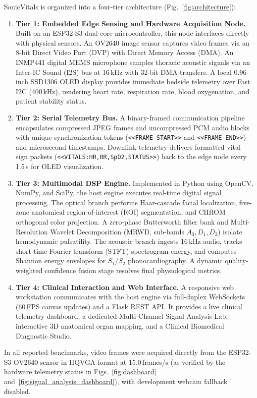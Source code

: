 \documentclass[journal]{IEEEtran}
\begin{document}
SonicVitals is organized into a four-tier architecture (Fig.~\ref{fig:architecture}):
\begin{enumerate}
  \item \textbf{Tier 1: Embedded Edge Sensing and Hardware Acquisition Node.} Built on an ESP32-S3 dual-core microcontroller, this node interfaces directly with physical sensors. An OV2640 image sensor captures video frames via an 8-bit Direct Video Port (DVP) with Direct Memory Access (DMA). An INMP441 digital MEMS microphone samples thoracic acoustic signals via an Inter-IC Sound (I2S) bus at 16\,kHz with 32-bit DMA transfers. A local 0.96-inch SSD1306 OLED display provides immediate bedside telemetry over Fast I2C (400\,kHz), rendering heart rate, respiration rate, blood oxygenation, and patient stability status.
  \item \textbf{Tier 2: Serial Telemetry Bus.} A binary-framed communication pipeline encapsulates compressed JPEG frames and uncompressed PCM audio blocks with unique synchronization tokens (\texttt{<<FRAME\_START>>} and \texttt{<<FRAME\_END>>}) and microsecond timestamps. Downlink telemetry delivers formatted vital sign packets (\texttt{<<VITALS:HR,RR,SpO2,STATUS>>}) back to the edge node every 1.5\,s for OLED visualization.
  \item \textbf{Tier 3: Multimodal DSP Engine.} Implemented in Python using OpenCV, NumPy, and SciPy, the host engine executes real-time digital signal processing. The optical branch performs Haar-cascade facial localization, five-zone anatomical region-of-interest (ROI) segmentation, and CHROM orthogonal color projection. A zero-phase Butterworth filter bank and Multi-Resolution Wavelet Decomposition (MRWD, sub-bands $A_3, D_1, D_2$) isolate hemodynamic pulsatility. The acoustic branch ingests 16\,kHz audio, tracks short-time Fourier transform (STFT) spectrogram energy, and computes Shannon energy envelopes for $S_1/S_2$ phonocardiography. A dynamic quality-weighted confidence fusion stage resolves final physiological metrics.
  \item \textbf{Tier 4: Clinical Interaction and Web Interface.} A responsive web workstation communicates with the host engine via full-duplex WebSockets (60\,FPS canvas updates) and a Flask REST API. It provides a live clinical telemetry dashboard, a dedicated Multi-Channel Signal Analysis Lab, interactive 3D anatomical organ mapping, and a Clinical Biomedical Diagnostic Studio.
\end{enumerate}

In all reported benchmarks, video frames were acquired directly from the ESP32-S3 OV2640 sensor in HQVGA format at 15.0\,frames/s (as verified by the hardware telemetry status in Figs.~\ref{fig:dashboard} and~\ref{fig:signal_analysis_dashboard}), with development webcam fallback disabled.
\end{document}

